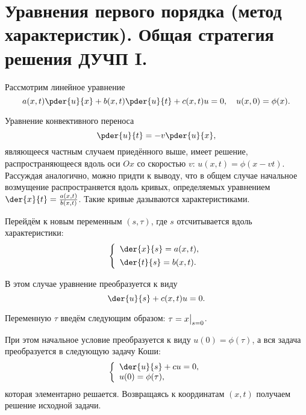 \chapter{Уравнения первого порядка (метод характеристик). Общая стратегия
решения ДУЧП I.}

Рассмотрим линейное уравнение
\[
    a(x, t)\pder{u}{x} + b(x, t)\pder{u}{t} + c(x, t)u = 0, \quad
    u(x, 0) = \phi(x).
\]

Уравнение конвективного переноса
\[
    \pder{u}{t} = -v\pder{u}{x},
\]
являющееся частным случаем приедённого выше, имеет решение, распространяющееся
вдоль оси \( Ox \) со скоростью \( v \): \( u(x,t) = \phi(x-vt) \). Рассуждая
аналогично, можно придти к выводу, что в общем случае начальное возмущение
распространяется вдоль кривых, определяемых уравнением
\( \der{x}{t} = \frac{a(x,t)}{b(x,t)} \). Такие кривые дазываются
характеристиками. 

Перейдём к новым переменным \( (s, \tau) \), где \( s \) отсчитывается вдоль
характеристики:
\[
    \left\{ \begin{array}{l}
        \ds \der{x}{s} = a(x, t), \\[.4em]
        \ds \der{t}{s} = b(x, t).
    \end{array} \right.
\]

В этом случае уравнение преобразуется к виду
\[
    \der{u}{s} + c(x, t)u = 0.
\]

Переменную \( \tau \) введём следующим образом: \( \displaystyle \tau = x\bigr|_{s=0} \).

При этом начальное условие преобразуется к виду \( u(0) = \phi(\tau) \), а вся
задача преобразуется в следующую задачу Коши:
\[
    \left\{ \begin{array}{l}
        \ds \der{u}{s} + cu = 0, \\
        u(0) = \phi(\tau),
    \end{array} \right.
\]
которая элементарно решается. Возвращаясь к координатам \( (x, t) \) получаем
решение исходной задачи.
\newpage

